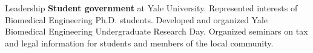 \begin{rubric}{Leadership}
\entry*[2017 -- 2021]%
	\textbf{Student government} at Yale University. Represented interests of Biomedical Engineering Ph.D. students. Developed and organized Yale Biomedical Engineering Undergraduate Research Day. Organized seminars on tax and legal information for students and members of the local community.
\end{rubric}
